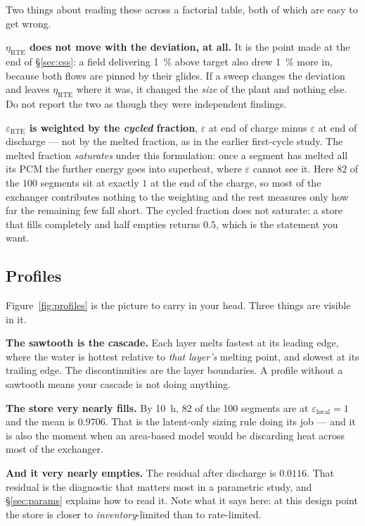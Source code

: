 \documentclass[11pt,a4paper]{article}
\newcommand{\epsloc}{\ensuremath{\varepsilon_{\mathrm{local}}}}
\begin{document}
\noindent
Two things about reading these across a factorial table, both of which are easy
to get wrong.

\textbf{$\eta_{\mathrm{RTE}}$ does not move with the deviation, at all.} It is
the point made at the end of \S\ref{sec:css}: a field delivering
\SI{1}{\percent} above target also drew \SI{1}{\percent} more in, because both
flows are pinned by their glides. If a sweep changes the deviation and leaves
$\eta_{\mathrm{RTE}}$ where it was, it changed the \emph{size} of the plant and
nothing else. Do not report the two as though they were independent findings.

\textbf{$\varepsilon_{\mathrm{RTE}}$ is weighted by the \emph{cycled} fraction},
$\varepsilon$ at end of charge minus $\varepsilon$ at end of discharge --- not by
the melted fraction, as in the earlier first-cycle study. The melted fraction
\emph{saturates} under this formulation: once a segment has melted all its PCM
the further energy goes into superheat, where $\varepsilon$ cannot see it. Here
$82$ of the $100$ segments sit at exactly $1$ at the end of the charge, so most
of the exchanger contributes nothing to the weighting and the rest measures only
how far the remaining few fall short. The cycled fraction does not saturate: a
store that fills completely and half empties returns $0.5$, which is the
statement you want.

\subsection*{Profiles}

Figure~\ref{fig:profiles} is the picture to carry in your head. Three things
are visible in it.

\textbf{The sawtooth is the cascade.} Each layer melts fastest at its leading
edge, where the water is hottest relative to \emph{that layer's} melting point,
and slowest at its trailing edge. The discontinuities are the layer boundaries.
A profile without a sawtooth means your cascade is not doing anything.

\textbf{The store very nearly fills.} By \SI{10}{\hour}, \num{82} of the
\num{100} segments are at $\epsloc=1$ and the mean is $0.9706$. That is the
latent-only sizing rule doing its job --- and it is also the moment when an
area-based model would be discarding heat across most of the exchanger.

\textbf{And it very nearly empties.} The residual after discharge is $0.0116$.
That residual is the diagnostic that matters most in a parametric study, and
\S\ref{sec:params} explains how to read it. Note what it says here: at this
design point the store is closer to \emph{inventory}-limited than to
rate-limited.
\end{document}
